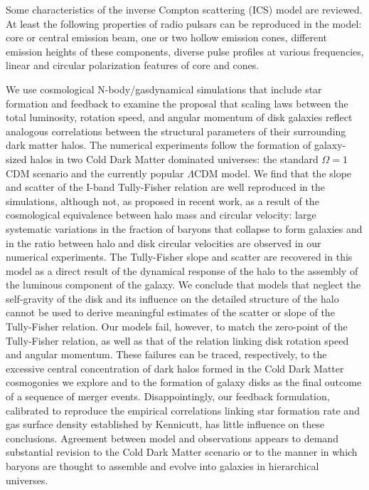 
Some characteristics of the inverse Compton scattering (ICS) model
are reviewed. At least the following properties of radio pulsars
can be reproduced in the model: core or central emission beam, one
or two hollow emission cones, different emission heights of these
components, diverse pulse profiles at various frequencies, linear
and circular polarization features of core and cones.

We use cosmological N-body/gasdynamical simulations that include star formation
and feedback to examine the proposal that scaling laws between the total
luminosity, rotation speed, and angular momentum of disk galaxies reflect
analogous correlations between the structural parameters of their surrounding
dark matter halos.  The numerical experiments follow the formation of
galaxy-sized halos in two Cold Dark Matter dominated universes: the standard
$\Omega=1$ CDM scenario and the currently popular $\Lambda$CDM model.  We find
that the slope and scatter of the I-band Tully-Fisher relation are well
reproduced in the simulations, although not, as proposed in recent work, as a
result of the cosmological equivalence between halo mass and circular velocity:
large systematic variations in the fraction of baryons that collapse to form
galaxies and in the ratio between halo and disk circular velocities are observed
in our numerical experiments. The Tully-Fisher slope and scatter are recovered
in this model as a direct result of the dynamical response of the halo to the
assembly of the luminous component of the galaxy. We conclude that models that
neglect the self-gravity of the disk and its influence on the detailed structure
of the halo cannot be used to derive meaningful estimates of the scatter or
slope of the Tully-Fisher relation. Our models fail, however, to match the
zero-point of the Tully-Fisher relation, as well as that of the relation linking
disk rotation speed and angular momentum. These failures can be traced,
respectively, to the excessive central concentration of dark halos formed in the
Cold Dark Matter cosmogonies we explore and to the formation of galaxy disks as
the final outcome of a sequence of merger events. Disappointingly, our feedback
formulation, calibrated to reproduce the empirical correlations linking star
formation rate and gas surface density established by Kennicutt, has little
influence on these conclusions. Agreement between model and observations appears
to demand substantial revision to the Cold Dark Matter scenario or to the manner
in which baryons are thought to assemble and evolve into galaxies in
hierarchical universes.
